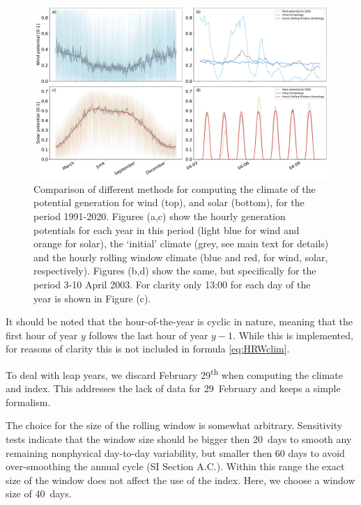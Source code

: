 \documentclass[12pt]{iopart}
\newcommand{\ts}[1]{\textsuperscript{#1}}
\begin{document}
\begin{figure}[b]
        \centering
        \includegraphics[width=.95\textwidth]{Figures/Climatology_v2.pdf}
        \caption{
                Comparison of different methods for computing the climate of the potential generation for wind (top), and solar (bottom), for the period 1991-2020. 
                Figures (a,c) show the hourly generation potentials for each year in this period (light blue for wind and orange for solar), the `initial' climate (grey, see main text for details) and the hourly rolling window climate (blue and red, for wind, solar, respectively). 
                Figures (b,d) show the same, but specifically for the period 3-10 April 2003. 
                For clarity only 13:00 for each day of the year is shown in Figure (c).}
        \label{fig:climate}
\end{figure}

It should be noted that the hour-of-the-year is cyclic in nature, meaning that the first hour of year $y$ follows the last hour of year $y-1$. 
While this is implemented, for reasons of clarity this is not included in formula \ref{eq:HRWclim}. 

To deal with leap years, we discard February 29\ts{th} when computing the climate and index. 
This addresses the lack of data for 29~February and keeps a simple formalism.

The choice for the size of the rolling window is somewhat arbitrary. 
Sensitivity tests indicate that the window size should be bigger then 20~days to smooth any remaining nonphysical day-to-day variability, but smaller then 60 days to avoid over-smoothing the annual cycle (SI Section A.C.). 
Within this range the exact size of the window does not affect the use of the index. 
Here, we choose a window size of 40~days.
\end{document}
